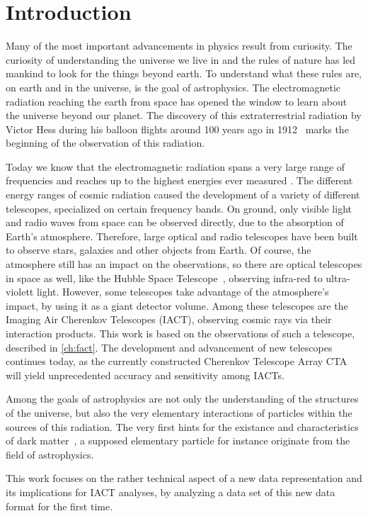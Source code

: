 \chapter{Introduction}
\nocite{biblatex, siunitx, scikit-learn, Hunter:2007}%

Many of the most important advancements in physics result from curiosity. The
curiosity of understanding the universe we live in and the rules of nature has
led mankind to look for the things beyond earth. To understand what these rules
are, on earth and in the universe, is the goal of astrophysics. The electromagnetic radiation reaching the earth from space has opened the window to learn
about the universe beyond our planet. The discovery of this extraterrestrial
radiation by Victor Hess during his balloon flights around \num{100} years ago in \num{1912}~\cite{Hess} marks the beginning of the observation of this radiation.

Today we know that the electromagnetic radiation spans a very large range of
frequencies and reaches up to the highest energies ever measured \cite{source}.
The different energy ranges of cosmic radiation caused the development of a
variety of different telescopes, specialized on certain frequency bands. On
ground, only visible light and radio waves from space can be observed directly,
due to the absorption of Earth's atmosphere. Therefore, large optical and radio
telescopes have been built to observe stars, galaxies and other objects from
Earth. Of course, the atmosphere still has an impact on the observations, so
there are optical telescopes in space as well, like the Hubble Space
Telescope~\cite{hubble}, observing infra-red to ultra-violett light. However,
some telescopes take advantage of the atmosphere's impact, by using it as a
giant detector volume. Among these telescopes are the Imaging Air Cherenkov
Telescopes (IACT), observing cosmic rays via their interaction products. This
work is based on the observations of such a telescope, described in
\autoref{ch:fact}. The development and advancement of new telescopes continues
today, as the currently constructed Cherenkov Telescope Array CTA~\cite{cta}
will yield unprecedented accuracy and sensitivity among IACTs.

Among the goals of astrophysics are not only the understanding of the
structures of the universe, but also the very elementary interactions of
particles within the sources of this radiation. The very first hints for the
existance and characteristics of dark matter~\cite{zwicky}, a supposed
elementary particle for instance originate from the field of astrophysics.

This work focuses on the rather technical aspect of a new data representation
and its implications for IACT analyses, by analyzing a data set of this new data
format for the first time.
